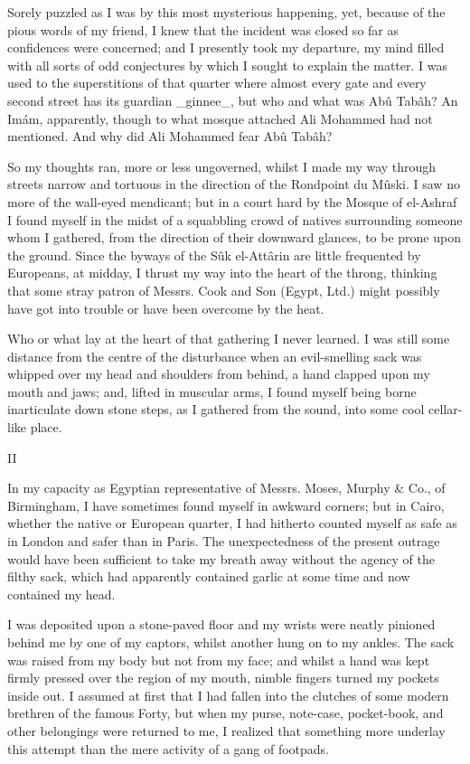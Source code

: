 Sorely puzzled as I was by this most mysterious happening, yet,
because of the pious words of my friend, I knew that the incident was
closed so far as confidences were concerned; and I presently took my
departure, my mind filled with all sorts of odd conjectures by which I
sought to explain the matter. I was used to the superstitions of that
quarter where almost every gate and every second street has its
guardian _ginnee_, but who and what was Abû Tabâh? An Imám,
apparently, though to what mosque attached Ali Mohammed had not
mentioned. And why did Ali Mohammed fear Abû Tabâh?

So my thoughts ran, more or less ungoverned, whilst I made my way
through streets narrow and tortuous in the direction of the Rondpoint
du Mûski. I saw no more of the wall-eyed mendicant; but in a court
hard by the Mosque of el-Ashraf I found myself in the midst of a
squabbling crowd of natives surrounding someone whom I gathered, from
the direction of their downward glances, to be prone upon the ground.
Since the byways of the Sûk el-Attârin are little frequented by
Europeans, at midday, I thrust my way into the heart of the throng,
thinking that some stray patron of Messrs. Cook and Son (Egypt, Ltd.)
might possibly have got into trouble or have been overcome by the
heat.

Who or what lay at the heart of that gathering I never learned. I was
still some distance from the centre of the disturbance when an
evil-smelling sack was whipped over my head and shoulders from behind,
a hand clapped upon my mouth and jaws; and, lifted in muscular arms,
I found myself being borne inarticulate down stone steps, as I gathered
from the sound, into some cool cellar-like place.


II

In my capacity as Egyptian representative of Messrs. Moses, Murphy &
Co., of Birmingham, I have sometimes found myself in awkward corners;
but in Cairo, whether the native or European quarter, I had hitherto
counted myself as safe as in London and safer than in Paris. The
unexpectedness of the present outrage would have been sufficient to
take my breath away without the agency of the filthy sack, which had
apparently contained garlic at some time and now contained my head.

I was deposited upon a stone-paved floor and my wrists were neatly
pinioned behind me by one of my captors, whilst another hung on to my
ankles. The sack was raised from my body but not from my face; and
whilst a hand was kept firmly pressed over the region of my mouth,
nimble fingers turned my pockets inside out. I assumed at first that I
had fallen into the clutches of some modern brethren of the famous
Forty, but when my purse, note-case, pocket-book, and other belongings
were returned to me, I realized that something more underlay this
attempt than the mere activity of a gang of footpads.

